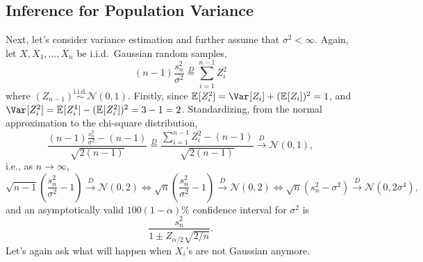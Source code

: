 \subsection{Inference for Population Variance}
Next, let's consider variance estimation and further assume that \(\sigma ^2 < \infty \). Again, let \(X, X_1, \dots , X_n\) be i.i.d.\ Gaussian random samples,
\[
	(n-1) \frac{s_n^2}{\sigma ^2}
	\overset{D}{=} \sum_{i=1}^{n-1} Z_i^2
\]
where \((Z_{n-1}) \overset{\text{i.i.d.} }{\sim } \mathcal{N} (0, 1)\). Firstly, since \(\mathbb{E}_{}[Z_i^2] = \Var_{}[Z_i] + (\mathbb{E}_{}[Z_i] )^2 = 1\), and \(\Var_{}[Z_i^2] = \mathbb{E}_{}[Z_i^4] - (\mathbb{E}_{}[Z_i^2] )^2 = 3 - 1 = 2\). Standardizing, from the normal approximation to the chi-square distribution,
\[
	\frac{(n-1) \frac{s_n^2}{\sigma ^2} - (n - 1)}{\sqrt{2 (n-1)} }
	\overset{D}{=} \frac{\sum_{i=1}^{n-1} Z_i^2 - (n-1)}{\sqrt{2 (n-1)} }
	\overset{D}{\to } \mathcal{N} (0, 1),
\]
i.e., as \(n \to \infty \),
\[
	\sqrt{n-1} \left( \frac{s_n^2}{\sigma ^2} - 1 \right)  \overset{D}{\to } \mathcal{N} (0, 2)
	\iff \sqrt{n} \left( \frac{s_n^2}{\sigma ^2} - 1 \right)  \overset{D}{\to } \mathcal{N} (0, 2)
	\iff \sqrt{n} (s_n^2 - \sigma ^2) \overset{D}{\to } \mathcal{N} (0, 2 \sigma ^4),
\]
and an asymptotically valid \(100 (1 - \alpha )\%\) confidence interval for \(\sigma ^2\) is
\[
	\frac{s_n^2}{1 \pm Z_{\alpha / 2} \sqrt{2 / n} }.
\]
Let's again ask what will happen when \(X_i\)'s are not Gaussian anymore.

